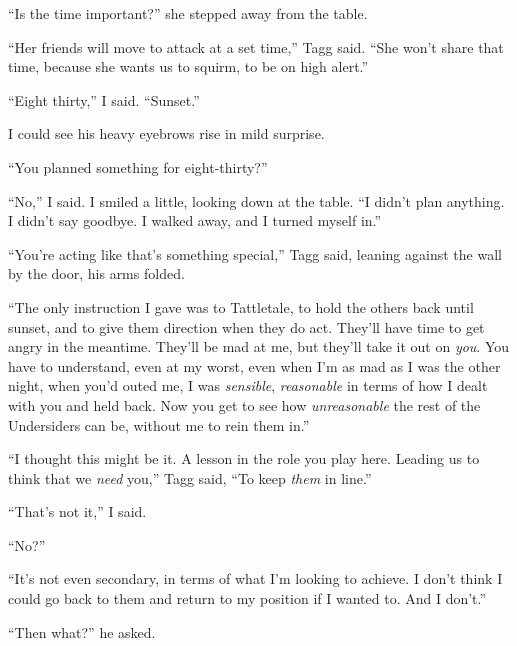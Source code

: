 ``Is the time important?'' she stepped away from the table.



``Her friends will move to attack at a set time,'' Tagg said.  ``She won't share that time, because she wants us to squirm, to be on high alert.''



``Eight thirty,'' I said.  ``Sunset.''



I could see his heavy eyebrows rise in mild surprise.



``You planned something for eight-thirty?''



``No,'' I said.  I smiled a little, looking down at the table.  ``I didn't plan anything.  I didn't say goodbye.  I walked away, and I turned myself in.''



``You're acting like that's something special,'' Tagg said, leaning against the wall by the door, his arms folded.



``The only instruction I gave was to Tattletale, to hold the others back until sunset, and to give them direction when they do act.  They'll have time to get angry in the meantime.  They'll be mad at me, but they'll take it out on \emph{you}.  You have to understand, even at my worst, even when I'm as mad as I was the other night, when you'd outed me, I was \emph{sensible}, \emph{reasonable} in terms of how I dealt with you and held back.  Now you get to see how \emph{unreasonable} the rest of the Undersiders can be, without me to rein them in.''



``I thought this might be it.  A lesson in the role you play here.  Leading us to think that we \emph{need} you,'' Tagg said, ``To keep \emph{them} in line.''



``That's not it,'' I said.



``No?''



``It's not even secondary, in terms of what I'm looking to achieve.  I don't think I could go back to them and return to my position if I wanted to.  And I don't.''



``Then what?'' he asked.



